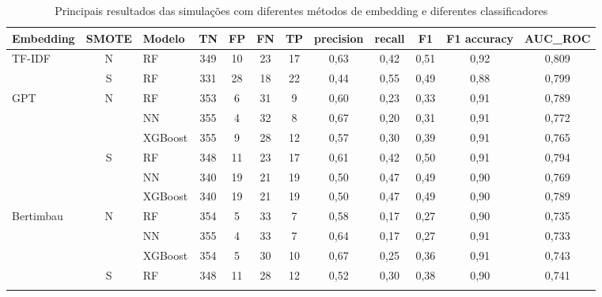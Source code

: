 \documentclass[conference]{IEEEtran}
\begin{document}
\begin{table}[t]
\centering
\caption{Principais resultados das simulações com diferentes métodos de embedding e diferentes classificadores}
\label{table:resultados}
\def\arraystretch{1.2}
\begin{tabular}{lclccccccccc}
\hline
Embedding                          & SMOTE              & Modelo  & TN  & FP & FN & TP & precision & recall & F1 & F1 accuracy & AUC\_ROC \\ \hline
\multirow{2}{*}{TF-IDF}            & N                  & RF      & 349 & 10 & 23 & 17 & 0,63 & 0,42 & 0,51  & 0,92    & 0,809    \\ \cline{2-12} 
                                   & S                  & RF      & 331 & 28 & 18 & 22 & 0,44 & 0,55 & 0,49  & 0,88    & 0,799    \\ \hline
\multirow{6}{*}{GPT}               & \multirow{3}{*}{N} & RF      & 353 & 6  & 31 & 9  & 0,60& 0,23 & 0,33  & 0,91    & 0,789    \\ \cline{3-12} 
                                   &                    & NN      & 355 & 4  & 32 & 8  & 0,67 & 0,20& 0,31  & 0,91    & 0,772    \\ \cline{3-12} 
                                   &                    & XGBoost & 355 & 9  & 28 & 12 & 0,57 & 0,30& 0,39  & 0,91    & 0,765    \\ \cline{2-12} 
                                   & \multirow{3}{*}{S} & RF      & 348 & 11 & 23 & 17 & 0,61 & 0,42 & 0,50& 0,91    & 0,794    \\ \cline{3-12} 
                                   &                    & NN      & 340 & 19 & 21 & 19 & 0,50& 0,47 & 0,49  & 0,90& 0,769    \\ \cline{3-12} 
                                   &                    & XGBoost & 340 & 19 & 21 & 19 & 0,50& 0,47 & 0,49  & 0,90& 0,789    \\ \hline
\multirow{6}{*}{Bertimbau}         & \multirow{3}{*}{N} & RF      & 354 & 5  & 33 & 7  & 0,58 & 0,17 & 0,27  & 0,90& 0,735    \\ \cline{3-12} 
                                   &                    & NN      & 355 & 4  & 33 & 7  & 0,64 & 0,17 & 0,27  & 0,91    & 0,733    \\ \cline{3-12} 
                                   &                    & XGBoost & 354 & 5  & 30 & 10 & 0,67 & 0,25 & 0,36  & 0,91    & 0,743    \\ \cline{2-12} 
                                   & \multirow{3}{*}{S} & RF      & 348 & 11 & 28 & 12 & 0,52 & 0,30& 0,38  & 0,90& 0,741    \\ \cline{3-12} 

\end{tabular}
\end{table}
\end{document}
